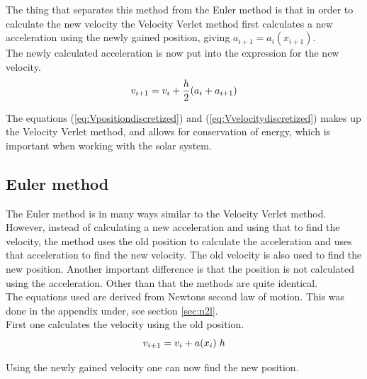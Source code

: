 \documentclass{article}
\begin{document}
    The thing that separates this method from the Euler method is that in order to calculate the new velocity the Velocity Verlet method first calculates a new acceleration using the newly gained position, giving $a_{i+1} = a_i (x_{i+1})$. \\

    The newly calculated acceleration is now put into the expression for the new velocity. \\

    \begin{equation}    \label{eq:Vvelocitydiscretized}
        v_{i+1} = v_i + \frac{h}{2} (a_i+a_{i+1})  \\
    \end{equation}

    The equations (\ref{eq:Vpositiondiscretized}) and (\ref{eq:Vvelocitydiscretized}) makes up the Velocity Verlet method, and allows for conservation of energy, which is important when working with the solar system. \\

\subsection{Euler method}

    The Euler method is in many ways similar to the Velocity Verlet method. However, instead of calculating a new acceleration and using that to find the velocity, the method uses the old position to calculate the acceleration and uses that acceleration to find the new velocity. The old velocity is also used to find the new position. Another important difference is that the position is not calculated using the acceleration. Other than that the methods are quite identical. \\

    The equations used are derived from Newtons second law of motion. This was done in the appendix under, see section \ref{sec:n2l}. \\

    First one calculates the velocity using the old position. \\

    \begin{equation}    \label{eq:Evelocity}
        v_{i+1} = v_i +  a(x_i) \; h \\
    \end{equation}

    Using the newly gained velocity one can now find the new position. \\
\end{document}
